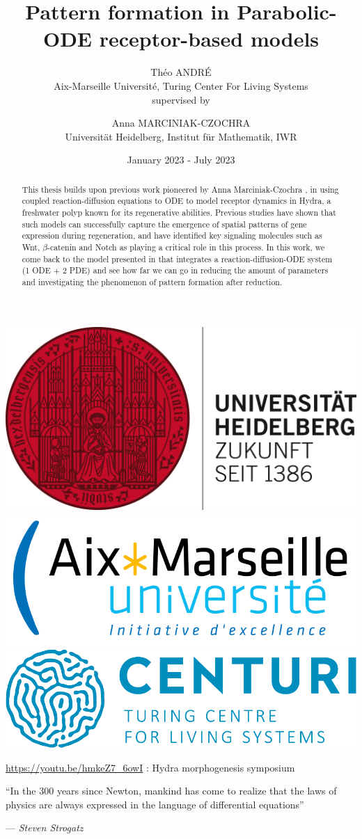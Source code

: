 \documentclass[12pt]{article}
\title{\textbf{Pattern formation in  Parabolic-ODE receptor-based models}}
\author{Théo ANDRÉ \\ Aix-Marseille Université, Turing Center For Living Systems \vspace{1em} \\   \vspace{1em} \small{supervised by} \and Anna MARCINIAK-CZOCHRA \\ Universität Heidelberg, Institut für Mathematik, IWR}
\date{January 2023 - July 2023}
\begin{document}
\maketitle

%

\vspace{1.5cm}
\begin{abstract}
This thesis builds upon previous work pioneered by Anna Marciniak-Czochra \cite{AnnaThesis}, in using coupled reaction-diffusion equations to ODE to model receptor dynamics in Hydra, a freshwater polyp known for its regenerative abilities. Previous studies have shown that such models can successfully capture the emergence of spatial patterns of gene expression during regeneration, and have identified key signaling molecules such as Wnt, $\beta$-catenin and Notch as playing a critical role in this process. In this work, we come back to the model presented in \cite{AnnaThesis} that integrates a  reaction-diffusion-ODE system (1 ODE + 2 PDE) and see how far we can go in reducing the amount of parameters and investigating the phenomenon of pattern formation after reduction.
\end{abstract}

\vfill

\centering
\includegraphics[width=0.23\linewidth]{figures/uni_heidelberg_logo.png}
\hfill
\includegraphics[width=0.3\linewidth]{figures/AMULOGO.png}
\hfill
\includegraphics[width=0.32\linewidth]{figures/centurilogo.png}

\justifying


\newpage

\tableofcontents
\bigskip\bigskip

\url{https://youtu.be/hmkeZ7_6owI} : Hydra morphogenesis symposium


\newpage



		\epigraph{``In the 300 years since Newton, mankind has come to realize that the laws of physics are always expressed in the language of differential equations''}{--- \textit{Steven Strogatz}}



%


%


%

%

\newpage

\appendix



\nocite{*}
\printbibliography
\end{document}
